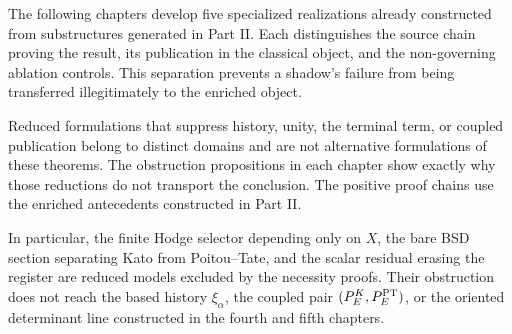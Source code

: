 The following chapters develop five specialized realizations already constructed from substructures generated in Part II. Each distinguishes the source chain proving the result, its publication in the classical object, and the non-governing ablation controls. This separation prevents a shadow's failure from being transferred illegitimately to the enriched object.

Reduced formulations that suppress history, unity, the terminal term, or coupled publication belong to distinct domains and are not alternative formulations of these theorems. The obstruction propositions in each chapter show exactly why those reductions do not transport the conclusion. The positive proof chains use the enriched antecedents constructed in Part II.

In particular, the finite Hodge selector depending only on \(X\), the bare BSD section separating Kato from Poitou--Tate, and the scalar residual erasing the register are reduced models excluded by the necessity proofs. Their obstruction does not reach the based history \(\xi_\alpha\), the coupled pair \((P_E^K,P_E^{\rm PT})\), or the oriented determinant line constructed in the fourth and fifth chapters.
